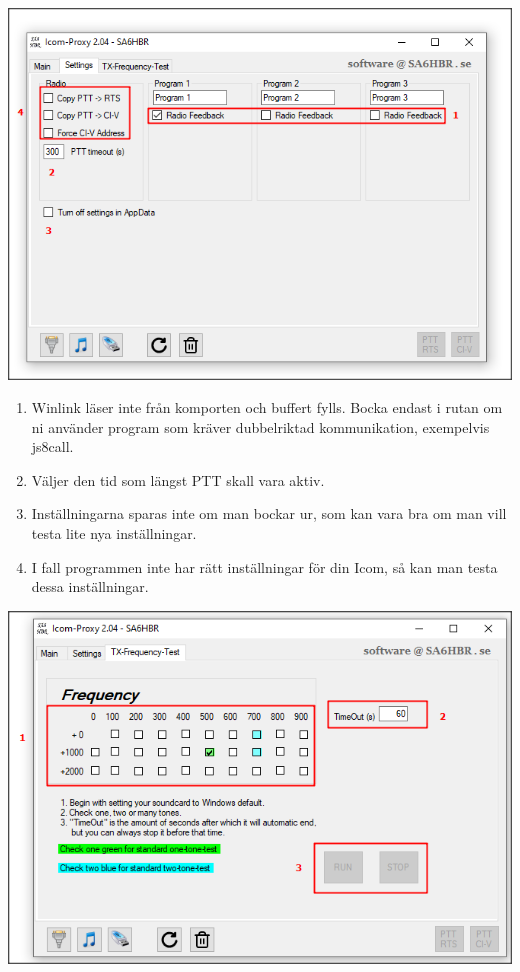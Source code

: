 \documentclass[a4paper]{article}
\begin{document}
\includegraphics[width=1\textwidth]{../image/Icom_Proxy_settings.png}\\[0.5cm] 


\begin{enumerate}   
\item Winlink läser inte från komporten och buffert fylls. Bocka endast i rutan om ni använder program som kräver dubbelriktad kommunikation, exempelvis js8call.
\item Väljer den tid som längst PTT skall vara aktiv.
\item Inställningarna sparas inte om man bockar ur, som kan vara bra om man vill testa lite nya inställningar. 
\item I fall programmen inte har rätt inställningar för din Icom, så kan man testa dessa inställningar.
\end{enumerate}  

\includegraphics[width=1\textwidth]{../image/Icom_Proxy_frequence_test.png}\\[0.5cm] 
\end{document}

